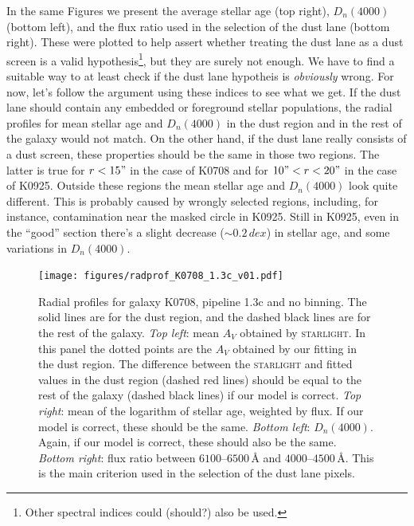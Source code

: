 \documentclass[a4paper]{article}
\newcommand{\angstrom}{\text{\AA}}
\def\starlight{\textsc{starlight}\xspace}
\begin{document}

In the same Figures we present the average stellar age (top right), $D_n(4000)$
(bottom left), and the flux ratio used in the selection of the dust lane (bottom
right). These were plotted to help assert whether treating the dust lane as a
dust screen is a valid hypothesis\footnote{Other spectral indices could
(should?) also be used.}, but they are surely not enough. We have to find a
suitable way to at least check if the dust lane hypotheis is {\em obviously}
wrong. For now, let's follow the argument using these indices to see what we
get. If the dust lane should contain any embedded or foreground stellar
populations, the radial profiles for mean stellar age and $D_n(4000)$ in the
dust region and in the rest of the galaxy would not match. On the other hand, if
the dust lane really consists of a dust screen, these properties should be the
same in those two regions. The latter is true for $r < 15"$ in the case of K0708
and for $10" < r < 20"$ in the case of K0925. Outside these regions the mean
stellar age and $D_n(4000)$ look quite different. This is probably caused by
wrongly selected regions, including, for instance, contamination near the masked
circle in K0925. Still in K0925, even in the ``good'' section there's a slight
decrease ($\sim 0.2\,dex$) in stellar age, and some variations in $D_n(4000)$.


\begin{figure}
\texttt{[image: figures/radprof\_K0708\_1.3c\_v01.pdf]}

\caption{Radial profiles for galaxy K0708, pipeline 1.3c and no binning. The
solid lines are for the dust region, and the dashed black lines are for the rest
of the galaxy. {\em Top left}: mean $A_V$ obtained by \starlight. In this panel
the dotted points are the $A_V$ obtained by our fitting in the dust region. The
difference between the \starlight and fitted values in the dust region (dashed
red lines) should be equal to the rest of the galaxy (dashed black lines) if
our model is correct. {\em Top right}: mean of the logarithm of stellar age,
weighted by flux. If our model is correct, these should be the same. {\em Bottom
left}: $D_n(4000)$. Again, if our model is correct, these should also be the
same. {\em Bottom right}: flux ratio between $6100$--$6500\,\angstrom$ and
$4000$--$4500\,\angstrom$. This is the main criterion used in the selection of
the dust lane pixels.}
\label{fig:radprofK0708}
\end{figure}
\end{document}
